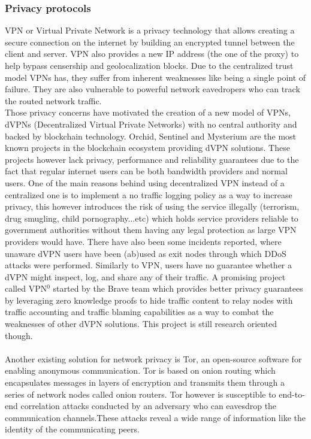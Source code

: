 \subsubsection{Privacy protocols}
VPN or Virtual Private Network is a privacy technology that allows creating a secure connection on the internet by building an encrypted tunnel between the client and server. VPN also provides a new IP address (the one of the proxy) to help bypass censership and geolocalization blocks.
Due to the centralized trust model VPNs has, they suffer from inherent weaknesses like being a single point of failure. They are also vulnerable to powerful network eavedropers who can track the routed network traffic.
\\Those privacy concerns have motivated the creation of a new model of VPNs, dVPNs (Decentralized Virtual Private Networks) with no central authority and backed by blockchain technology. Orchid, Sentinel and Mysterium are the most known projects in the blockchain ecosystem providing dVPN solutions. These projects however lack privacy, performance and reliability guarantees due to the fact that regular internet users can be both bandwidth providers and normal users. One of the main reasons behind using decentralized VPN instead of a centralized one is to implement a no traffic logging policy as a way to increase privacy, this however introduces the risk of using the service illegally (terrorism, drug smugling, child pornography...etc) which holds service providers reliable to government authorities without them having any legal protection as large VPN providers would have. There have also been some incidents reported, where unaware dVPN users have been (ab)used as exit nodes through which DDoS attacks were performed. Similarly to VPN, users have no guarantee whether a dVPN might inspect, log, and share any of their traffic. A promising project called VPN$^0$ started by the Brave team which provides better privacy guarantees by leveraging zero knowledge proofs to hide traffic content to relay nodes with traffic accounting and traffic blaming capabilities as a way to combat the weaknesses of other dVPN solutions. This project is still research oriented though.
\\~\\ Another existing solution for network privacy is Tor, an open-source software for enabling anonymous communication. Tor is based on onion routing which encapsulates messages in layers of encryption and transmits them through a series of network nodes called onion routers. Tor however is susceptible to end-to-end correlation attacks conducted by an adversary who can eavesdrop the communication channels.These attacks reveal a wide range of information like the identity of the communicating peers.
